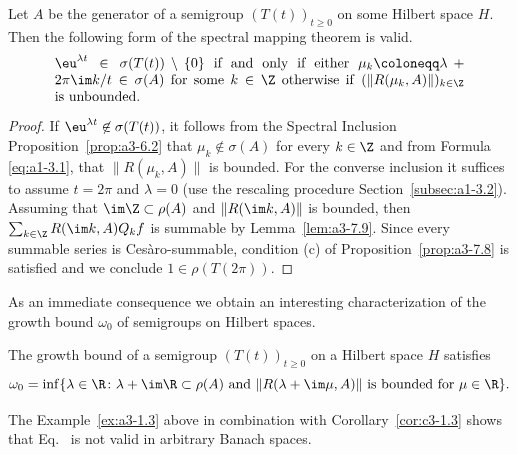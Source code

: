 \begin{theorem}\label{thm:a3-7.10}
%
Let $A$ be the generator of a semigroup $(T(t))_{t\geq 0}$ on some Hilbert space $H$.
Then the following form of the spectral mapping theorem is valid.
\[
\begin{minipage}{.85\textwidth}
	$ \eu^{\lambda t} \in \sigma(T(t))\setminus\{0\} $ if and only if either 
	$\mu_{k}\coloneqq \lambda + 2\pi\im  k/t \in \sigma(A)$ for some  $k \in \Z$
	otherwise  if\/ $(\|R(\mu_{k},A)\|)_{k\in\Z}$ is unbounded.
\end{minipage}
\]
\end{theorem}
\begin{proof}
If\/ $\eu^{\lambda t} \not\in \sigma(T(t))$, it follows from the Spectral Inclusion Proposition~\ref{prop:a3-6.2} that $\mu_{k} \not\in \sigma(A)$ for every $k \in \Z$ and from Formula \eqref{eq:a1-3.1},  that $\|R(\mu_{k},A)\|$ is bounded.
For the converse inclusion it suffices to assume $t = 2\pi$ and $\lambda = 0$ (use the rescaling procedure Section~\ref{subsec:a1-3.2}).
Assuming that $\im\Z \subset \rho(A)$ and $\|R(\im k,A)\|$ is bounded, then $\sum_{k\in\Z} R(\im k,A)Q_{k}f$ is summable by Lemma~\ref{lem:a3-7.9}.
Since every summable series is Cesàro-summable, condition (c) of Proposition~\ref{prop:a3-7.8} is satisfied and we conclude $1 \in \rho(T(2\pi))$.
\end{proof}
As an immediate consequence we obtain an interesting characterization of the growth bound $\omega_{0}$ of semigroups on Hilbert spaces.
\begin{corollary}\label{cor:a3-7.11}
%
The growth bound 
of a semigroup $(T(t))_{t\geq 0}$ on a Hilbert space $H$ satisfies
\begin{equation}\label{eq:a3-7.9}
\omega_{0} = \inf \{\lambda \in \R \colon \lambda + \im\R \subset \rho(A) \text{ and } \|R(\lambda+\im\mu,A)\| \text{ is bounded for } \mu \in \R\} .
\end{equation}
\end{corollary}
The Example~\ref{ex:a3-1.3} above in combination with Corollary~\ref{cor:c3-1.3} shows that Eq.~ is not valid in arbitrary Banach spaces.
